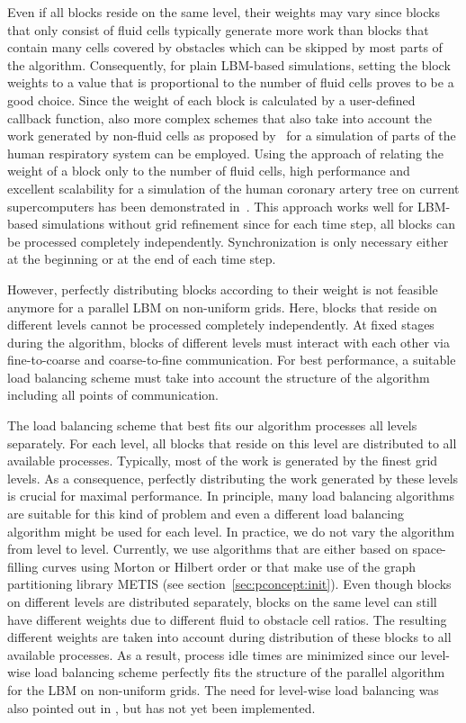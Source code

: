 \documentclass[final,leqno,onefignum,onetabnum]{siamltex1213}
\begin{document}
Even if all blocks reside on the same level,
their weights may vary since blocks that only consist of fluid cells typically generate more work than blocks that contain many cells covered by obstacles
which can be skipped by most parts of the algorithm.
Consequently, for plain LBM-based simulations,
setting the block weights to a value that is proportional to the number of fluid cells proves to be a good choice.
Since the weight of each block is calculated by a user-defined callback function,
also more complex schemes that also take into account the work generated by non-fluid cells as proposed by~\cite{fietz2012}
for a simulation of parts of the human respiratory system can be employed.
Using the approach of relating the weight of a block only to the number of fluid cells,
high performance and excellent scalability for a simulation of the human coronary artery tree
on current supercomputers has been demonstrated in~\cite{Godenschwager2013}.
This approach works well for LBM-based simulations without grid refinement since for each time step, all blocks can be processed completely independently.
Synchronization is only necessary either at the beginning or at the end of each time step.

However, perfectly distributing blocks according to their weight is not feasible anymore for a parallel LBM on non-uniform grids.
Here, blocks that reside on different levels cannot be processed completely independently.
At fixed stages during the algorithm, blocks of different levels must interact with each other via fine-to-coarse and coarse-to-fine communication.
For best performance, a suitable load balancing scheme must take into account the structure of the algorithm including all points of communication.

The load balancing scheme that best fits our algorithm processes all levels separately.
For each level, all blocks that reside on this level are distributed to all available processes.
Typically, most of the work is generated by the finest grid levels.
As a consequence, perfectly distributing the work generated by these levels is crucial for maximal performance.
In principle, many load balancing algorithms are suitable for this kind of problem and even a different load balancing algorithm might be used for each level.
In practice, we do not vary the algorithm from level to level.
Currently, we use algorithms that
are either based on space-filling curves using Morton or Hilbert order or that make use of the graph partitioning library METIS \cite{karypis1999} (see section~\ref{sec:pconcept:init}).
Even though blocks on different levels are distributed separately, blocks on the same level can still have different weights due to different fluid to obstacle cell ratios.
The resulting different weights are taken into account during distribution of these blocks to all available processes.
As a result, process idle times are minimized since our level-wise load balancing scheme perfectly fits the structure of the parallel algorithm for the LBM on non-uniform grids.
The need for level-wise load balancing was also pointed out in \cite{Hasert:229088}, but has not yet been implemented.
\end{document}
